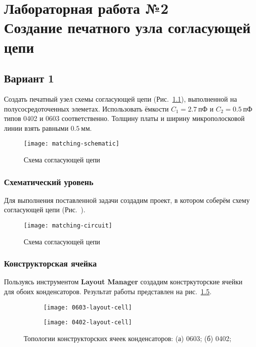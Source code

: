 \chapter{%
    Лабораторная работа №2\\
    Создание печатного узла согласующей цепи
}

\section{Вариант 1}

Создать печатный узел схемы согласующей цепи (Рис.~\ref{fig:matching-schematic}), выполненной на полусосредоточенных элеметах.
Использовать ёмкости $C_1 = 2.7~\text{пФ}$ и $C_2 = 0.5~\text{пФ}$ типов 0402 и 0603 соответственно.
Толщину платы и ширину микрополосковой линии взять равными $0.5~\text{мм}$.
\begin{figure}[H]
    \centering
    \texttt{[image: matching-schematic]}
    \caption{Схема согласующей цепи}%
    \label{fig:matching-schematic}
\end{figure}

\subsection{Схематический уровень}

Для выполнения поставленной задачи создадим проект, в котором соберём схему согласующей цепи (Рис.~).
\begin{figure}[H]
    \centering
    \texttt{[image: matching-circuit]}
    \caption{Схема согласующей цепи}%
    \label{fig:matching-circuit}
\end{figure}

\subsection{Конструкторская ячейка}

Пользуясь инструментом \textbf{Layout Manager} создадим констркуторские ячейки для обоих конденсаторов.
Результат работы представлен на рис.~\ref{fig:layout-cells}.
\begin{figure}[H]
    \centering
    \begin{subfigure}{0.45\textwidth}
        \centering
        \texttt{[image: 0603-layout-cell]}
        \caption{}%
        \label{fig:0603-layout-cell}
    \end{subfigure}
    \hfill
    \begin{subfigure}{0.45\textwidth}
        \centering
        \texttt{[image: 0402-layout-cell]}
        \caption{}%
        \label{fig:0402-layout-cell}
    \end{subfigure}
    \caption{%
        Топологии конструкторских ячеек конденсаторов:
        (а) 0603;
        (б) 0402;
    }%
    \label{fig:layout-cells}
\end{figure}

